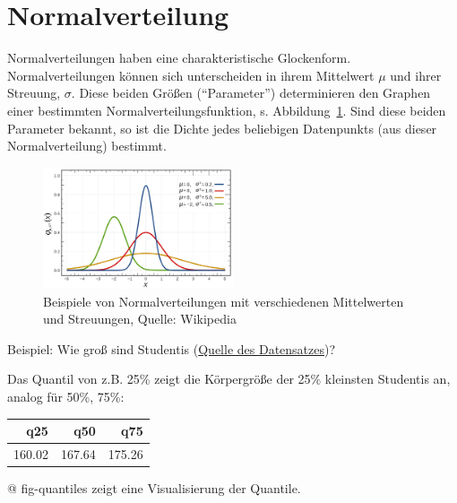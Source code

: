 \documentclass[
  a4paper,
  DIV=11]{scrreprt}
\theoremstyle{definition}
\theoremstyle{remark}
\begin{document}
\hypertarget{normalverteilung}{%
\section{Normalverteilung}\label{normalverteilung}}

Normalverteilungen haben eine charakteristische Glockenform.
Normalverteilungen können sich unterscheiden in ihrem Mittelwert \(\mu\)
und ihrer Streuung, \(\sigma\). Diese beiden Größen (``Parameter'')
determinieren den Graphen einer bestimmten Normalverteilungsfunktion, s.
Abbildung~\ref{fig-norms}. Sind diese beiden Parameter bekannt, so ist
die Dichte jedes beliebigen Datenpunkts (aus dieser Normalverteilung)
bestimmt.

\begin{figure}

{\centering \includegraphics[width=0.5\textwidth,height=\textheight]{./img/normals.png}

}

\caption{\label{fig-norms}Beispiele von Normalverteilungen mit
verschiedenen Mittelwerten und Streuungen, Quelle: Wikipedia}

\end{figure}

Beispiel: Wie groß sind Studentis
(\href{https://rdrr.io/cran/openintro/man/speed_gender_height.html}{Quelle
des Datensatzes})?

Das Quantil von z.B. 25\% zeigt die Körpergröße der 25\% kleinsten
Studentis an, analog für 50\%, 75\%:

\begin{longtable}{rrr}
\toprule
q25 & q50 & q75 \\ 
\midrule
160.02 & 167.64 & 175.26 \\ 
\bottomrule
\end{longtable}

@ fig-quantiles zeigt eine Visualisierung der Quantile.
\end{document}
